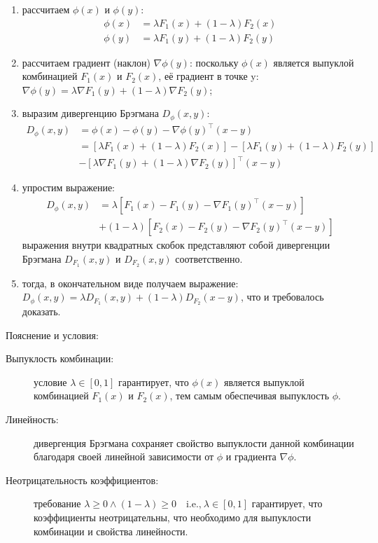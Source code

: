 \documentclass[12pt]{scrartcl}
\begin{document}
\begin{enumerate}
    \item рассчитаем $\phi(x)$ и $\phi(y)$:
    \begin{align*}
        \phi(x) &= \lambda F_{1}(x) + (1 - \lambda)F_{2}(x)\\
        \phi(y) &= \lambda F_{1}(y) + (1 - \lambda)F_{2}(y)
    \end{align*}
    \item рассчитаем градиент (наклон) $\nabla \phi(y)$: поскольку $\phi (x)$ является выпуклой комбинацией $F_{1}(x)$ и $F_{2}(x)$, её градиент в точке y: $\nabla \phi (y) = \lambda \nabla F_{1}(y) + (1 - \lambda) \nabla F_{2}(y)$;
    \item выразим дивергенцию Брэгмана $D_{\phi}(x,y)$:
    \begin{align*}
        D_{\phi}(x,y) &= \phi(x) - \phi(y) - \nabla \phi(y)^{\top}(x - y) \\
        &= \left[\lambda F_{1}(x) + (1 - \lambda)F_{2}(x)\right] - \left[\lambda F_{1}(y) + (1 - \lambda)F_{2}(y)\right] \\
        &- \left[\lambda \nabla F_{1}(y) + (1 - \lambda) \nabla F_{2}(y)\right]^{\top}(x - y)
    \end{align*}
    \item упростим выражение:
    \begin{align*}
        D_{\phi}(x,y) &= \lambda \left[F_{1}(x) - F_{1}(y) - \nabla F_{1}(y)^{\top}(x - y)\right] \\
        &+ (1 - \lambda) \left[F_{2}(x) - F_{2}(y) - \nabla F_{2}(y)^{\top}(x-y)\right]
    \end{align*}
    выражения внутри квадратных скобок представляют собой дивергенции Брэгмана $D_{F_{1}}(x,y)$ и $D_{F_{2}}(x,y)$ соответственно.
    \item тогда, в окончательном виде получаем выражение: $D_{\phi}(x,y) = \lambda D_{F_{1}}(x,y) + (1 - \lambda)D_{F_{2}}(x - y)$, что и требовалось доказать.
\end{enumerate}
Пояснение и условия:
\begin{description}
    \item[Выпуклость комбинации:] условие $\lambda \in [0,1]$ гарантирует, что $\phi(x)$ является выпуклой комбинацией $F_{1}(x)$ и $F_{2}(x)$, тем самым обеспечивая выпуклость $\phi$.
    \item[Линейность:] дивергенция Брэгмана сохраняет свойство выпуклости данной комбинации благодаря своей линейной зависимости от $\phi$ и градиента $\nabla \phi$.
    \item[Неотрицательность коэффициентов:] требование $\lambda \geq 0 \wedge (1 - \lambda) \geq 0 \quad \text{i.e.,}\ \lambda \in [0,1]$ гарантирует, что коэффициенты неотрицательны, что необходимо для выпуклости комбинации и свойства линейности.
\end{description}
\end{document}
